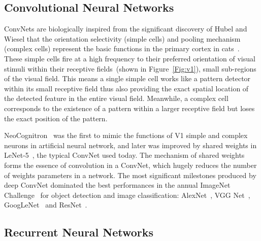 \subsection{Convolutional Neural Networks}
ConvNets are biologically inspired from the significant discovery of Hubel and Wiesel that the orientation selectivity (simple cells) and pooling mechanism (complex cells) represent the basic functions in the primary cortex in cats~\cite{hubel1962receptive}.
These simple cells fire at a high frequency to their preferred orientation of visual stimuli within their receptive fields~(shown in Figure~\ref{Fig:v1}), small sub-regions of the visual field.
This means a single simple cell works like a pattern detector within its small receptive field thus also providing the exact spatial location of the detected feature in the entire visual field.
Meanwhile, a complex cell corresponds to the existence of a pattern within a larger receptive field but loses the exact position of the pattern.

NeoCognitron~\cite{fukushima1982neocognitron} was the first to mimic the functions of V1 simple and complex neurons in artificial neural network, and later was improved by shared weights in LeNet-5~\cite{lecun1998gradient}, the typical ConvNet used today.
The mechanism of shared weights forms the essence of convolution in a ConvNet, which hugely reduces the number of weights parameters in a network.
The most significant milestones produced by deep ConvNet dominated the best performances in the annual ImageNet Challenge~\cite{russakovsky2015imagenet} for object detection and image classification: AlexNet~\cite{krizhevsky2012imagenet}, VGG Net~\cite{simonyan2014very}, GoogLeNet~\cite{szegedy2015going} and ResNet~\cite{he2016deep}.


\subsection{Recurrent Neural Networks}
%
%
%


